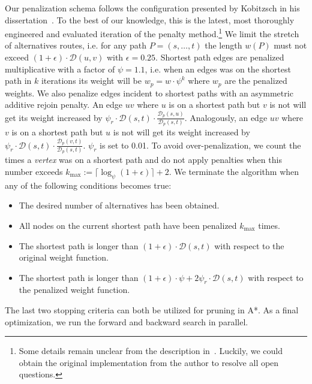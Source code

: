 \documentclass[a4paper, english, cleveref]{lipics-v2021}
\newcommand*{\dist}{\mathcal{D}}
\begin{document}
Our penalization schema follows the configuration presented by Kobitzsch in his dissertation~\cite{kobitzsch2015alternative}.
To the best of our knowledge, this is the latest, most thoroughly engineered and evaluated iteration of the penalty method.\footnote{
Some details remain unclear from the description in~\cite{kobitzsch2015alternative}.
Luckily, we could obtain the original implementation from the author to resolve all open questions.
}
We limit the stretch of alternatives routes, i.e. for any path $P = (s,\dots,t)$ the length $w(P)$ must not exceed $(1+\epsilon) \cdot \dist(u,v)$ with $\epsilon = 0.25$.
Shortest path edges are penalized multiplicative with a factor of $\psi = 1.1$, i.e. when an edges was on the shortest path in $k$ iterations its weight will be $w_p = w\cdot\psi^k$ where $w_p$ are the penalized weights.
We also penalize edges incident to shortest paths with an asymmetric additive rejoin penalty.
An edge $uv$ where $u$ is on a shortest path but $v$ is not will get its weight increased by $\psi_r \cdot \dist(s,t) \cdot \frac{\dist_p(s,u)}{\dist_p(s,t)}$.
Analogously, an edge $uv$ where $v$ is on a shortest path but $u$ is not will get its weight increased by $\psi_r \cdot \dist(s,t) \cdot \frac{\dist_p(v,t)}{\dist_p(s,t)}$.
$\psi_r$ is set to 0.01.
To avoid over-penalization, we count the times a \emph{vertex} was on a shortest path and do not apply penalties when this number exceeds $k_{\max} := \lceil\log_{\psi}(1+\epsilon)\rceil + 2$.
We terminate the algorithm when any of the following conditions becomes true:
\begin{itemize}
  \item The desired number of alternatives has been obtained.
  \item All nodes on the current shortest path have been penalized $k_{\max}$ times.
  \item The shortest path is longer than $(1+\epsilon) \cdot \dist(s,t)$ with respect to the original weight function.
  \item The shortest path is longer than $(1+\epsilon) \cdot \psi + 2\psi_r \cdot \dist(s,t)$ with respect to the penalized weight function.
\end{itemize}
The last two stopping criteria can both be utilized for pruning in A*.
As a final optimization, we run the forward and backward search in parallel.
\end{document}
